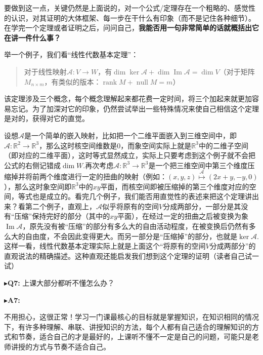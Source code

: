 \documentclass{ctexart}
\begin{document}
要做到这一点，关键仍然是上面说的，对一个公式/定理存在一个粗略的、感觉性的认识，对其证明的大体框架、每一步在干什么有印象（而不是记住各种细节）。在学完一个定理或者证明之后，问问自己，\textbf{我能否用一句非常简单的话就概括出它在讲一件什么事？}

\begin{myexample}
  
举一个例子，我们看“线性代数基本定理”：
  
  \begin{quote}
    对于线性映射$\mathcal{A}:V \rightarrow W$，有$\dim{\ker\mathcal{A}} + \dim{\operatorname{Im} \mathcal{A}} = \dim V$（对于矩阵$M_{n \times m}$，有类似的版本：$\operatorname{rank} M + \operatorname{null} M = m$）
  \end{quote}
  
  该定理涉及三个概念，每个概念理解起来都花费一定时间，将三个加起来就更加容易忘记。为了加深对它的印象，仍然尝试举出一些特殊情况来使自己相信这个定理是对的，获得对它的直觉。
  
  设想$\mathcal{A}$是一个简单的嵌入映射，比如把一个二维平面嵌入到三维空间中，即$\mathcal{A}: \mathbb{R}^{2} \rightarrow \mathbb{R}^{3}$，那么这时核空间维数是0，而象空间实际上就是$\mathbb{R}^{3}$中的二维子空间（即对应的二维平面），这时等式显然成立，实际上只要考虑到这个例子就不会把公式的右侧记错成$\dim W$.再次考虑$\mathcal{A}: \mathbb{R}^{3} \rightarrow \mathbb{R}^{3}$是一个把三维空间中第三个维度压缩掉并将前两个维度进行一定的扭曲的映射（例如：$(x,y,z)\overset{\mathcal{A}}{\mapsto}(2x + y, - y,0)$），那么这时象空间即$\mathbb{R}^{3}$中的$xy$平面，而核空间即被压缩掉的第三个维度对应的空间，等式也是成立的。看完几个例子，我们能否用直觉性的表述来把这个定理讲出来？看第二个例子，直观上，$\mathcal{A}$似乎将原有的空间$V$分成两部分，一部分是其没有“压缩”保持完好的部分（其中的$xy$平面），在经过一定的扭曲之后被变换为象$\operatorname{Im} \mathcal{A}$，原先没有被“压缩”的部分有多么大的自由活动程度，在被变换后仍然有多么大的自由度，不会因此变得更大。而另一部分是“压缩掉”的部分，也就是$\ker\mathcal{A}$.这样一看，线性代数基本定理实际上就是上面这个“将原有的空间$V$分成两部分”的直观说法的精确描述。这种直观还能启发我们想到这个定理的证明（读者自己试一试）
\end{myexample}
  
\noindent$\blacktriangleright$\;\textbf{Q7:} 上课大部分都听不懂怎么办？
  
\noindent$\blacktriangleright$\;\textbf{A7:}
  
不用担心，这很正常！学习一门课最核心的目标就是掌握知识，在知识相同的情况下，有许多种理解、串联、讲授知识的方法，每个人都有自己适合的理解知识的方式和节奏，适合自己的才是最好的，上课听不懂不一定是自己的问题，可能只是老师讲授的方式与节奏不适合自己。
\end{document}
